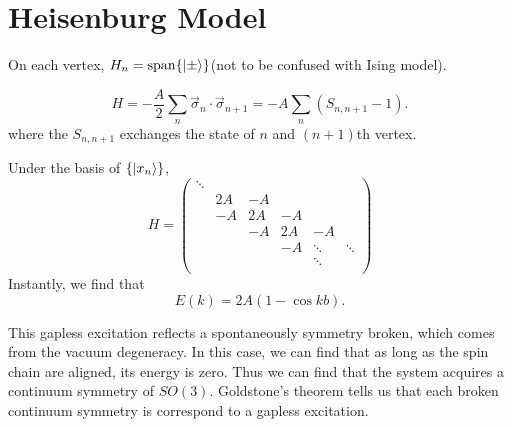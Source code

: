 \setcounter{chapter}{14}
\chapter[海森堡模型]{Heisenburg Model}

On each vertex, $H_n = \operatorname{span} \{ \ket{\pm } \}$(not to be confused with Ising model).

\begin{equation}
  H = - \frac{A}{2} \sum_{n} \vec{\sigma}_{n} \cdot \vec{\sigma}_{n+1}
  = - A \sum_{n} \left( S_{n, n+1} - 1 \right) .
\end{equation}
where the $S_{n, n+1}$ exchanges the state of $n$ and $(n+1)$th vertex.

Under the basis of $\{ \ket{x_n} \}$, 
\begin{equation}
  H = \begin{pmatrix}
   \ddots &  &  &  &  & \\
    & 2A & -A &  &  & \\
    & -A & 2A & -A &  & \\
    &  & -A & 2A & -A & \\
    &  &  & -A & \ddots & \ddots\\
    &  &  &  & \ddots & \\
  \end{pmatrix}
\end{equation}
Instantly, we find that
\begin{equation}
  E\left( k \right) = 2A \left( 1-\cos kb \right). 
\end{equation}

This gapless excitation reflects a spontaneously symmetry broken, which comes from the vacuum degeneracy. In this case, we can find that as long as the spin chain are aligned, its energy is zero. Thus we can find that the system acquires a continuum symmetry of $SO(3)$. Goldstone's theorem tells us that each broken continuum symmetry is correspond to a gapless excitation.

